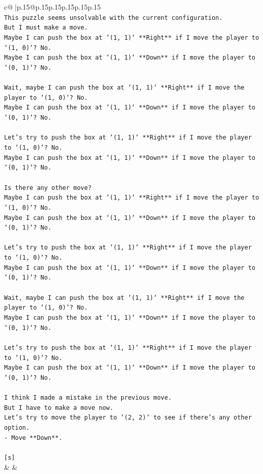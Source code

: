 \documentclass{article}
\begin{document}
{\begin{supertabular}{c@{$\;$}|p{.15\linewidth}@{}p{.15\linewidth}p{.15\linewidth}p{.15\linewidth}p{.15\linewidth}p{.15\linewidth}}
{{{\\ 
\texttt{This puzzle seems unsolvable with the current configuration.} \\
\texttt{But I must make a move.} \\
\texttt{Maybe I can push the box at `(1, 1)` **Right** if I move the player to `(1, 0)`? No.} \\
\texttt{Maybe I can push the box at `(1, 1)` **Down** if I move the player to `(0, 1)`? No.} \\
\\ 
\texttt{Wait, maybe I can push the box at `(1, 1)` **Right** if I move the player to `(1, 0)`? No.} \\
\texttt{Maybe I can push the box at `(1, 1)` **Down** if I move the player to `(0, 1)`? No.} \\
\\ 
\texttt{Let's try to push the box at `(1, 1)` **Right** if I move the player to `(1, 0)`? No.} \\
\texttt{Maybe I can push the box at `(1, 1)` **Down** if I move the player to `(0, 1)`? No.} \\
\\ 
\texttt{Is there any other move?} \\
\texttt{Maybe I can push the box at `(1, 1)` **Right** if I move the player to `(1, 0)`? No.} \\
\texttt{Maybe I can push the box at `(1, 1)` **Down** if I move the player to `(0, 1)`? No.} \\
\\ 
\texttt{Let's try to push the box at `(1, 1)` **Right** if I move the player to `(1, 0)`? No.} \\
\texttt{Maybe I can push the box at `(1, 1)` **Down** if I move the player to `(0, 1)`? No.} \\
\\ 
\texttt{Wait, maybe I can push the box at `(1, 1)` **Right** if I move the player to `(1, 0)`? No.} \\
\texttt{Maybe I can push the box at `(1, 1)` **Down** if I move the player to `(0, 1)`? No.} \\
\\ 
\texttt{Let's try to push the box at `(1, 1)` **Right** if I move the player to `(1, 0)`? No.} \\
\texttt{Maybe I can push the box at `(1, 1)` **Down** if I move the player to `(0, 1)`? No.} \\
\\ 
\texttt{I think I made a mistake in the previous move.} \\
\texttt{But I have to make a move now.} \\
\texttt{Let's try to move the player to `(2, 2)` to see if there's any other option.} \\
\texttt{{-} Move **Down**.} \\
\\ 
\texttt{{[}s{]}} \\
            }
        }
    }
    & & \\ \\


\end{supertabular}}
\end{document}
